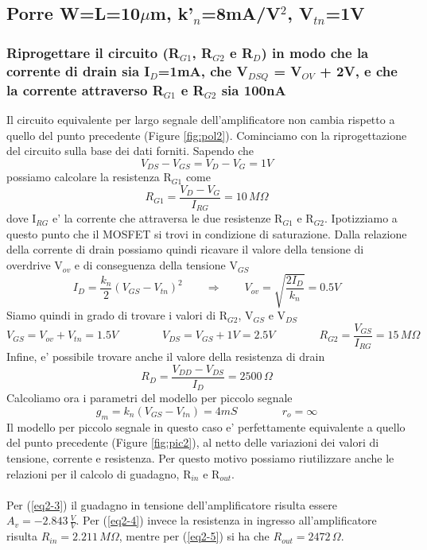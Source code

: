 \documentclass[a4paper,10pt]{article}
\begin{document}
\subsection{Porre W=L=10$\mu$m, k'$_n$=8mA/V$^2$, V$_{tn}$=1V}

\subsubsection{Riprogettare il circuito (R$_{G1}$, R$_{G2}$ e R$_D$) in modo che la corrente di drain sia I$_D$=1mA, che V$_{DSQ}$ = V$_{OV}$ + 2V, e che la corrente attraverso R$_{G1}$ e R$_{G2}$ sia 100nA}
Il circuito equivalente per largo segnale dell'amplificatore non cambia rispetto a quello del punto precedente (Figure \ref{fig:pol2}). Cominciamo con la riprogettazione del circuito sulla base dei dati forniti. Sapendo che 
\begin{equation*}
V_{DS} - V_{GS} = V_D - V_G = 1V
\end{equation*}
possiamo calcolare la resistenza R$_{G1}$ come
\begin{equation*}
R_{G1} = \frac{V_D-V_G}{I_{RG}} = 10 \,M\Omega
\end{equation*}
dove I$_{RG}$ e' la corrente che attraversa le due resistenze R$_{G1}$ e R$_{G2}$. Ipotizziamo a questo punto che il MOSFET si trovi in condizione di saturazione. Dalla relazione della corrente di drain possiamo quindi ricavare il valore della tensione di overdrive V$_{ov}$ e di conseguenza della tensione V$_{GS}$
\begin{equation*}
I_D=\frac{k_n}{2}(V_{GS}-V_{tn})^2 \qquad \Rightarrow \qquad V_{ov}=\sqrt{\frac{2I_D}{k_n}} = 0.5V
\end{equation*}
Siamo quindi in grado di trovare i valori di R$_{G2}$, V$_{GS}$ e V$_{DS}$
\begin{equation*}
V_{GS}=V_{ov}+V_{tn}=1.5V \qquad \qquad V_{DS} = V_{GS}+1V =2.5V \qquad \qquad R_{G2}=\frac{V_{GS}}{I_{RG}} = 15\, M\Omega
\end{equation*}
Infine, e' possibile trovare anche il valore della resistenza di drain
\begin{equation*}
R_D=\frac{V_{DD}-V_{DS}}{I_D} = 2500\, \Omega
\end{equation*}
Calcoliamo ora i parametri del modello per piccolo segnale
\begin{equation*}
g_m=k_n(V_{GS}-V_{tn}) = 4mS \qquad\qquad r_o=\infty
\end{equation*}
Il modello per piccolo segnale in questo caso e' perfettamente equivalente a quello del punto precedente (Figure \ref{fig:pic2}), al netto delle variazioni dei valori di tensione, corrente e resistenza. Per questo motivo possiamo riutilizzare anche le relazioni per il calcolo di guadagno, R$_{in}$ e R$_{out}$. \\ \\
Per (\ref{eq2-3}) il guadagno in tensione dell'amplificatore risulta essere $A_v=-2.843\,\frac{V}{V}$. Per (\ref{eq2-4}) invece la resistenza in ingresso all'amplificatore risulta $R_{in}=2.211\,M\Omega$, mentre per (\ref{eq2-5}) si ha che $R_{out}=2472\,\Omega$.
\end{document}
